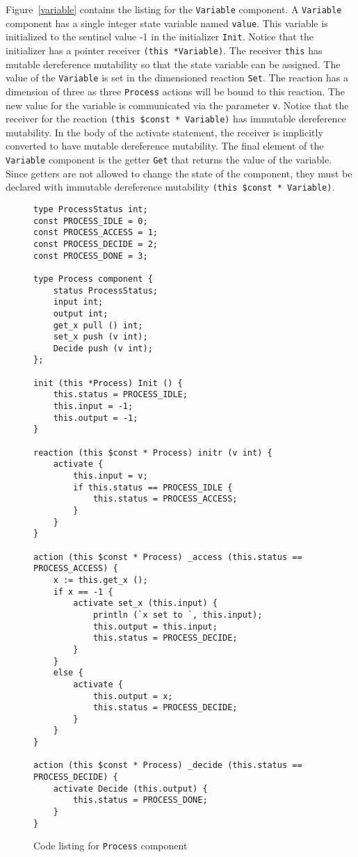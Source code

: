 Figure~\ref{variable} contains the listing for the \verb+Variable+ component.
A \verb+Variable+ component has a single integer state variable named \verb+value+.
This variable is initialized to the sentinel value -1 in the initializer \verb+Init+.
Notice that the initializer has a pointer receiver \verb+(this *Variable)+.
The receiver \verb+this+ has mutable dereference mutability so that the state variable can be assigned.
The value of the \verb+Variable+ is set in the dimensioned reaction \verb+Set+.
The reaction has a dimension of three as three \verb+Process+ actions will be bound to this reaction.
The new value for the variable is communicated via the parameter \verb+v+.
Notice that the receiver for the reaction \verb+(this $const * Variable)+ has immutable dereference mutability.
In the body of the activate statement, the receiver is implicitly converted to have mutable dereference mutability.
The final element of the \verb+Variable+ component is the getter \verb+Get+ that returns the value of the variable.
Since getters are not allowed to change the state of the component, they must be declared with immutable dereference mutability \verb+(this $const * Variable)+.

\begin{figure}
\begin{verbatim}
type ProcessStatus int;
const PROCESS_IDLE = 0;
const PROCESS_ACCESS = 1;
const PROCESS_DECIDE = 2;
const PROCESS_DONE = 3;

type Process component {
    status ProcessStatus;
    input int;
    output int;
    get_x pull () int;
    set_x push (v int);
    Decide push (v int);
};

init (this *Process) Init () {
    this.status = PROCESS_IDLE;
    this.input = -1;
    this.output = -1;
}

reaction (this $const * Process) initr (v int) {
    activate {
        this.input = v;
        if this.status == PROCESS_IDLE {
            this.status = PROCESS_ACCESS;
        }
    }
}

action (this $const * Process) _access (this.status == PROCESS_ACCESS) {
    x := this.get_x ();
    if x == -1 {
        activate set_x (this.input) {
            println (`x set to `, this.input);
            this.output = this.input;
            this.status = PROCESS_DECIDE;
        }
    }
    else {
        activate {
            this.output = x;
            this.status = PROCESS_DECIDE;
        }
    }
}

action (this $const * Process) _decide (this.status == PROCESS_DECIDE) {
    activate Decide (this.output) {
        this.status = PROCESS_DONE;
    }
}
\end{verbatim}
\cprotect\caption{Code listing for \verb+Process+ component \label{process}}
\end{figure}

